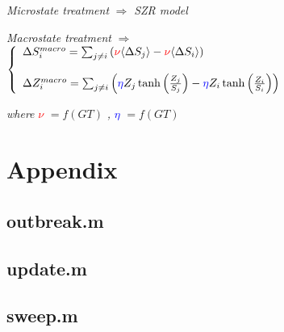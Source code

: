 \documentclass[11pt]{article} %
\begin{document}
\bigskip

\textit{Microstate treatment} $\Rightarrow$ \textit{SZR model} 

\bigskip

\textit{Macrostate treatment} $\Rightarrow$  $\left\{
	\begin{array}{l l}
		\Delta S_{i}^{macro} =  \sum_{j\neq i}{ \left( \textcolor{red}{\nu} \langle \Delta S_{j} \rangle - \textcolor{red}{\nu}  \langle \Delta S_{i} \rangle \right) }	
    \\
    \\
    		\Delta Z_{i}^{macro} = \sum_{j\neq i}{\left( \textcolor{blue}{\eta} Z_{j}\tanh \left( \frac{Z_{j}}{S_{j}}\right) -\textcolor{blue}{\eta} Z_{i}\tanh \left( \frac{Z_{i}}{S_{i}}\right) \right)}

	\end{array} \right.$

\bigskip

\textit{where} \textcolor{red}{$\nu$} $= f(GT)$ \textit{,} \textcolor{blue}{$\eta$} $= f(GT)$  
\bigskip




\newpage

\nocite{bennett1995modelling, balcan2011phase, funk2010modelling, reluga2010game, reluga2009sis}



\newpage

\section{Appendix}
\bigskip
\subsection{outbreak.m}
\label{sec:outbreak}

\bigskip
\bigskip
\bigskip

\subsection{update.m}
\label{sec:update}

\bigskip
\bigskip
\bigskip

\subsection{sweep.m}
\label{sec:sweep}

\bigskip
\bigskip
\bigskip
\end{document}
